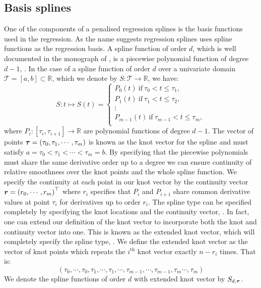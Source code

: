  \subsection{Basis splines  \label{ssec:basis_splines}}
 One of the components of a penalised regression splines is the basis functions used in the regression.
 As the name suggests regression splines uses spline functions as the regression basis.
 A spline function of order $d$,  which is well documented in the monograph of \citeauthor{de_boor_practical_2001}, is a piecewise polynomial function of degree $d-1$, \cite{de_boor_practical_2001}.
 In the case of a spline function of order $d$ over a univariate domain $\mathcal{T} = \left[a, b\right] \subset \mathbb{R}$, which we denote by $S: \mathcal{T} \to \mathbb{R}$,  we have: 
 \begin{equation}
 	S: t \mapsto S(t) = \begin{cases}
 		P_0(t)~\text{if}~ \tau_0 < t  \leq \tau_1,\\
 		P_1(t)~\text{if}~ \tau_1 < t  \leq \tau_2,\\
 		\vdots \\
 		P_{m-1}(t)~\text{if}~ \tau_{m-1} < t  \leq \tau_m,\\
 	\end{cases}
 \end{equation}
where $P_i: \left[\tau_i, \tau_{i+1}\right] \to \mathbb{R}$ are polynomial functions of degree $d-1$.
The vector of points $\bm{{\tau}} = \left(\tau_0, \tau_1, \cdots, \tau_m \right)$ is known as the knot vector for the spline and must satisfy $a=\tau_0 < \tau_1 < \cdots < \tau_m = b$.
By specifying that the piecewise polynomials must share the same derivative order up to a degree we can ensure continuity of relative smoothness over the knot points and the whole spline function.
We specify the continuity at each point in our knot vector by the continuity vector $\bm{{r}}=\left( r_0,\cdots, r_m \right)^\top$ where $r_i$ specifies that $P_i$ and $P_{i+1}$ share common derivative values at point $\tau_i$ for derivatives up to order $r_i$.
The spline type can be specified completely by specifying the knot locations and the continuity vector, \citep{de_boor_practical_2001}.
In fact, one can extend our definition of the knot vector to incorporate both the knot and continuity vector into one.
This is known as the extended knot vector, which will completely specify the spline type, \citep{de_boor_practical_2001}.
We define the extended knot vector as the vector of knot points which repeats the $i^\text{th}$ knot vector exactly $n - r_i$ times. That is:
\begin{equation*}
	(\tau_0,\cdots,\tau_0, \tau_1, \cdots, \tau_1 ,\cdots, \tau_{m-1},\cdots, \tau_{m-1}, \tau_m \cdots, \tau_m)
\end{equation*}
We denote the spline functions of order $d$ with extended knot vector by $S_{d, \bm{{\tau}}}$. 

